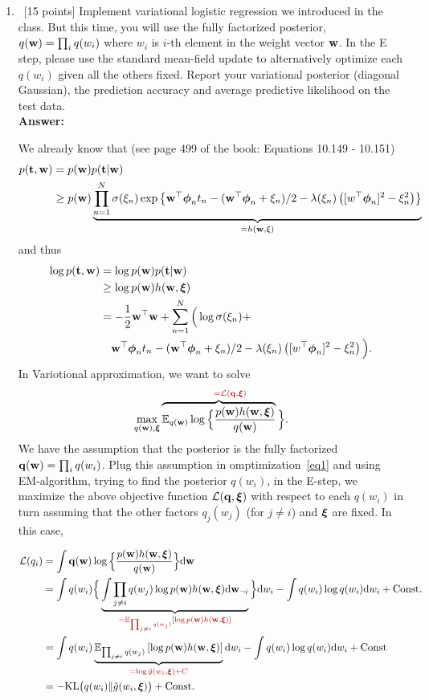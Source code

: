 \documentclass[12pt, fullpage,letterpaper]{article}
\def\red{\color{black!30!red}}
\def\blackblue{\color{black!40!blue}}
\begin{document}
\begin{enumerate}
\begin{enumerate}
{}
		\item~[15 points] Implement variational logistic regression we introduced in the class.  But this time, you will use the fully factorized posterior,   $q({\bf w})= \prod_i q(w_i)$ where $w_i$ is $i$-th element in the weight vector ${\bf w}$. In the E step, please use the standard mean-field update to alternatively optimize each $q(w_i)$ given all the others fixed. Report your variational posterior (\ie diagonal Gaussian), the prediction accuracy and average predictive likelihood on the test data.  \\
{\bf \red Answer: }{\blackblue 
We already know that (see page 499 of the book: Equations 10.149 - 10.151)
\begin{align*}
p({\bf t}, {\bf w}) & = p({\bf w}) p({\bf t}|{\bf w}) \\
&\geq p({\bf w}) \underbrace{\prod_{n=1}^N\sigma(\xi_n)\exp\left\{{\bf w}^\top \boldsymbol{\phi}_nt_n - ({\bf w}^\top\boldsymbol{\phi}_n + \xi_n)/  2 - \lambda(\xi_n)\left([w^\top\boldsymbol{\phi}_n]^2-\xi^2_n\right)\right\}}_{=h({\bf w},\xi)}
\end{align*}
and thus 
\begin{align}
\log p({\bf t}, {\bf w}) & = \log p({\bf w}) p({\bf t}|{\bf w})\nonumber \\
&\geq  \log p({\bf w})h({\bf w},\boldsymbol{\xi})\nonumber\\
&= -\frac{1}{2}{\bf w}^\top{\bf w} + \sum\limits_{n=1}^N\Big( \log\sigma(\xi_n) + \nonumber \\
&\quad   {\bf w}^\top \boldsymbol{\phi}_n t_n - ({\bf w}^\top\boldsymbol{\phi}_n + \xi_n)/ 2 - \lambda(\xi_n)\left([w^\top\boldsymbol{\phi}_n]^2-\xi^2_n\right)\Big)\label{mainvar}.
\end{align}
In Variotional approximation, we want to solve 
\begin{equation}\label{eq1}
\max\limits_{q(\w), \bxi}\overbrace{\mathbb{E}_{q(\w)}\log\Big\{\frac{p(\w)h(\w,\bxi)}{q(\w)}}^{{\red \quad\quad= \mathcal{L}(\q,\bxi)}}\Big\}.
\end{equation}
We have the assumption that the posterior is the fully factorized ${\bf q}({\bf w})= \prod_i q(w_i)$. 
Plug this assumption in omptimization~\ref{eq1} and using EM-algorithm, trying to find the posterior $q(w_i)$,  in the E-step, we maximize the above objective function $\mathcal{L}({\bf q},\boldsymbol{\xi})$
 with respect to each $q(w_i)$ in turn assuming that the other factors $q_j(w_j)$ (for $j\neq i$) and $\boldsymbol{\xi}$ are fixed.
 In this case, 
 
\begin{align}
\mathcal{L}(q_i) & = \int \q(\w)\log\Big\{\frac{p(\w)h(\w,\bxi)}{q(\w)}\Big\}\d\w\nonumber\\
& = \int q(w_i)\Big\{\underbrace{\int\prod_{j\neq i}q(w_j) \log p(\w)h(\w,\bxi)\d\w_{\neg i}}_{
{\red =\mathbb{E}_{\prod_{j\neq i} q(w_j)}\left[\log p(\w)h(\w,\bxi)\right]}}
\Big\}\d w_i - \int q(w_i)\log q(w_i)\d w_i + {\rm Const}.\nonumber\\
& = \int q(w_i)\underbrace{\mathbb{E}_{\prod_{j\neq i} q(w_j)}\left[\log p(\w)h(\w,\bxi)\right]}_{{\red =\log \tilde{g}(w_i,\bxi) + C}}\d w_i - \int q(w_i)\log q(w_i)\d w_i + {\rm Const}\nonumber\\
& = - {\rm KL}\big(q(w_i)\|\tilde{g}(w_i,\bxi)\big) +{\rm Const}.\label{KLD}
\end{align}

}
\end{enumerate}
\end{enumerate}
\end{document}

